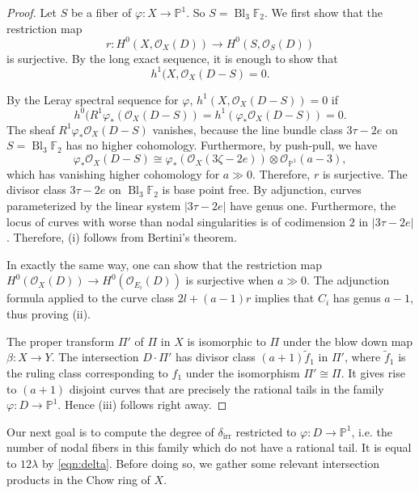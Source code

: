 \documentclass[11]{amsart}
\theoremstyle{plain}
\theoremstyle{definition}
\newcommand{\OO}{\mathcal O}
\newcommand{\wt}{\widetilde}
\newcommand{\irr}{\operatorname{irr}}
\newcommand{\Bl}{\operatorname{Bl}}
\newcommand{\bbF}{\mathbb F}
\newcommand{\bbP}{\mathbb P}
\begin{document}
\begin{proof}
 Let $S$ be a fiber of $\varphi: X \to \bbP^1$.  So $S = \Bl_{3}\bbF_{2}$.  We first show that the restriction map \[r : H^{0}(X, \OO_{X}(D)) \to H^{0}(S, \OO_{S}(D))\] is surjective.  By the long exact sequence, it is enough to show that \[h^{1}(X, \OO_{X}(D-S) = 0.\]  

By the Leray spectral sequence for $\varphi$, $h^{1}(X, \OO_{X}(D-S)) = 0$ if 
$$h^{0}(R^{1}\varphi_{*}(\OO_{X}(D-S)) = h^{1}(\varphi_{*}\OO_{X}(D-S))=0. $$  
The sheaf $R^{1}\varphi_{*}\OO_{X}(D-S)$ vanishes, because the line bundle class $3\tau - 2e$ on $S = \Bl_{3}\bbF_{2}$ has no higher cohomology.  Furthermore, by push-pull, we have 
$$\varphi_{*}\OO_{X}(D-S)\cong \varphi_{*}(\OO_{X}(3\zeta - 2e))\otimes \OO_{\bbP^{1}}(a-3),$$ 
which has vanishing higher cohomology for $a \gg 0$. 
Therefore, $r$ is surjective. The divisor class $3\tau - 2e$ on $\Bl_{3}\bbF_{2}$ is base point free. By adjunction, curves parameterized by the linear system $|3\tau - 2e|$ have genus one. Furthermore, the locus of curves with worse than nodal singularities is of codimension $2$ in $|3\tau - 2e|$.  Therefore, (i) follows from Bertini's theorem.  

In exactly the same way, one can show that the restriction map $H^{0}(\OO_{X}(D)) \to H^{0}(\OO_{E_{i}}(D))$ is surjective when $a\gg 0$. The adjunction formula applied to the curve class $2l + (a-1)r$ implies that $C_i$ 
has genus $a-1$, thus proving (ii).

The proper transform $\Pi'$ of $\Pi$ in $X$ is isomorphic to $\Pi$ under the blow down map $\beta: X\to Y$.  The intersection $D \cdot \Pi'$ has divisor class $(a+1)\wt{f}_{1}$ in $\Pi'$, where $\wt{f}_{1}$ is the ruling class 
corresponding to $f_1$ under the isomorphism $\Pi' \cong \Pi$. It gives rise to $(a+1)$ disjoint curves that are precisely the rational tails in the family $\varphi: D \to \bbP^1$. Hence (iii) follows right away.
\end{proof}
 
 Our next goal is to compute the degree of $\delta_{\irr}$ restricted to $\varphi: D\to \bbP^1$, i.e. the number of nodal fibers in this family which do not have a rational tail.  It is equal to $12 \lambda$ by \eqref{eqn:delta}.  Before doing so, we gather some relevant intersection products in the Chow ring of $X$.
 
\end{document}

